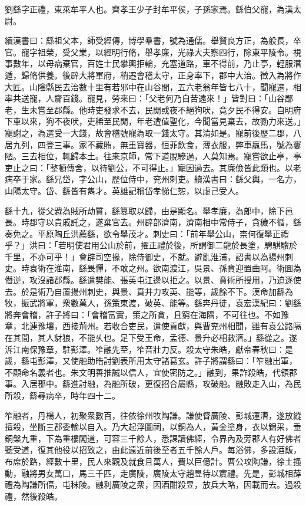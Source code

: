 
\begin{pinyinscope}
劉繇字正禮，東萊牟平人也。齊孝王少子封牟平侯，子孫家焉。繇伯父寵，為漢太尉。

續漢書曰：繇祖父本，師受經傳，博學羣書，號為通儒。舉賢良方正，為般長，卒官。寵字祖榮，受父業，以經明行脩，舉孝廉，光祿大夫察四行，除東平陵令。視事數年，以母病棄官，百姓士民攀輿拒輪，充塞道路，車不得前，乃止亭，輕服潛遁，歸脩供養。後辟大將軍府，稍遷會稽太守，正身率下，郡中大治。徵入為將作大匠。山陰縣民去治數十里有若邪中在山谷間，五六老翁年皆七八十，聞寵遷，相率共送寵，人齎百錢。寵見，勞來曰：「父老何乃自苦遠來！」皆對曰：「山谷鄙老，生未嘗至郡縣。他時吏發求不去，民閒或夜不絕狗吠，竟夕民不得安。自明府下車以來，狗不夜吠，吏稀至民閒，年老遭值聖化，今聞當見棄去，故勠力來送。」寵謝之，為選受一大錢，故會稽號寵為取一錢太守。其清如是。寵前後歷二郡，八居九列，四登三事。家不藏賄，無重寶器，恒菲飲食，薄衣服，弊車羸馬，號為窶陋。三去相位，輒歸本土。往來京師，常下道脫驂過，人莫知焉。寵嘗欲止亭，亭吏止之曰：「整頓傳舍，以待劉公，不可得止。」寵因過去。其廉儉皆此類也。以老病卒于家。繇兄岱，字公山，歷位侍中，兖州刺吏。續漢書曰：繇父輿，一名方，山陽太守。岱、繇皆有雋才。英雄記稱岱孝悌仁恕，以虛己受人。

繇十九，從父韙為賊所劫質，繇篡取以歸，由是顯名。舉孝廉，為郎中，除下邑長。時郡守以貴戚託之，遂棄官去。州辟部濟南，濟南相中常侍子，貪穢不循，繇奏免之。平原陶丘洪薦繇，欲令舉茂才。刺史曰：「前年舉公山，柰何復舉正禮乎？」洪曰：「若明使君用公山於前，擢正禮於後，所謂御二龍於長塗，騁騏驥於千里，不亦可乎！」會辟司空掾，除侍御史，不就。避亂淮浦，詔書以為揚州刺史。時袁術在淮南，繇畏憚，不敢之州。欲南渡江，吳景、孫賁迎置曲阿。術圖為僭逆，攻沒諸郡縣。繇遣樊能、張英屯江邊以拒之。以景、賁術所授用，乃迫逐使去。於是術乃自置揚州刺史，與景、賁并力攻英、能等，歲餘不下。漢命加繇為牧，振武將軍，衆數萬人，孫策東渡，破英、能等。繇奔丹徒，袁宏漢紀曰：劉繇將奔會稽，許子將曰：「會稽富實，策之所貪，且窮在海隅，不可往也。不如豫章，北連豫壤，西接荊州。若收合吏民，遣使貢獻，與曹兖州相聞，雖有袁公路隔在其間，其人豺狼，不能乆也。足下受王命，孟德、景升必相救濟。」繇從之。遂泝江南保豫章，駐彭澤。笮融先至，笮音壯力反。殺太守朱皓，獻帝春秋曰：是歲，繇屯彭澤，又使融助皓討劉表所用太守諸葛玄。許子將謂繇曰：「笮融出軍，不顧命名義者也。朱文明善推誠以信人，宜使密防之。」融到，果詐殺皓，代領郡事。入居郡中。繇進討融，為融所破，更復招合屬縣，攻破融。融敗走入山，為民所殺，繇尋病卒，時年四十二。

笮融者，丹楊人，初聚衆數百，往依徐州牧陶謙。謙使督廣陵、彭城運漕，遂放縱擅殺，坐斷三郡委輸以自入。乃大起浮圖祠，以銅為人，黃金塗身，衣以錦采，垂銅槃九重，下為重樓閣道，可容三千餘人，悉課讀佛經，令界內及旁郡人有好佛者聽受道，復其他役以招致之，由此遠近前後至者五千餘人戶。每浴佛，多設酒飯，布席於路，經數十里，民人來觀及就食且萬人，費以巨億計。曹公攻陶謙，徐土搔動，融將男女萬口，馬三千匹，走廣陵，廣陵太守趙昱待以賔禮。先是，彭城相薛禮為陶謙所偪，屯秣陵。融利廣陵之衆，因酒酣殺昱，放兵大略，因載而去。過殺禮，然後殺皓。


\end{pinyinscope}
